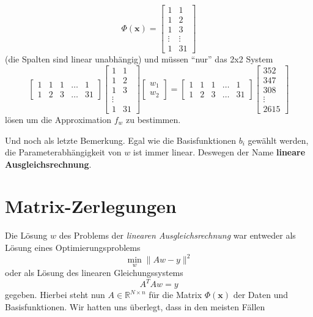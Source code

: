 \documentclass[]{book}
\theoremstyle{definition}
\theoremstyle{definition}
\theoremstyle{definition}
\theoremstyle{definition}
\theoremstyle{remark}
\begin{document}
\begin{equation*}
\Phi(\mathbf x) = 
\begin{bmatrix}
1 & 1 \\ 1 & 2 \\ 1 & 3 \\ \vdots & \vdots \\ 1 & 31
\end{bmatrix}
\end{equation*}
(die Spalten sind linear unabhängig) und müssen ``nur'' das 2x2 System
\[
\begin{bmatrix}
1 & 1 & 1 & \dots & 1 \\ 1 & 2 & 3 & \dots & 31
\end{bmatrix}
\begin{bmatrix}
1 & 1 \\ 1 & 2 \\ 1 & 3 \\ \vdots \\ 1 & 31
\end{bmatrix}
\begin{bmatrix}
w_1 \\ w_2
\end{bmatrix}
=
\begin{bmatrix}
1 & 1 & 1 & \dots & 1 \\ 1 & 2 & 3 & \dots & 31
\end{bmatrix} 
\begin{bmatrix}
352 \\  347 \\ 308 \\ \vdots \\ 2615
\end{bmatrix} 
\]
lösen um die Approximation \(f_w\) zu bestimmen.

Und noch als letzte Bemerkung. Egal wie die Basisfunktionen \(b_i\) gewählt werden, die Parameterabhängigkeit von \(w\) ist immer linear. Deswegen der Name \textbf{lineare Ausgleichsrechnung}.

\hypertarget{matrix-zerlegungen}{%
\chapter{Matrix-Zerlegungen}\label{matrix-zerlegungen}}

Die Lösung \(w\) des Problems der \emph{linearen Ausgleichsrechnung} war entweder als Lösung eines Optimierungsproblems
\begin{equation*}
\min_{w} \| Aw - y \|^2
\end{equation*}
oder als Lösung des linearen Gleichungssystems
\begin{equation*}
A^TAw=y
\end{equation*}
gegeben. Hierbei steht nun \(A\in \mathbb R^{N\times n}\) für die Matrix \(\Phi(\mathbf x)\) der Daten und Basisfunktionen. Wir hatten uns überlegt, dass in den meisten Fällen
\end{document}
